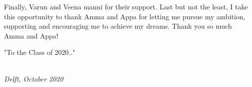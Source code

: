 Finally, Varun and Veena manni for their support. Last but not the least, I take this opportunity to thank Amma and Appa for letting me pursue my ambition, supporting and encouraging me to achieve my dreams. Thank you so much Amma and Appa!   

\vspace{7mm}

"To the Class of 2020.."


\begin{flushright}
{\makeatletter\itshape
    \@author \\
    Delft, October 2020
\makeatother}
\end{flushright}





 




